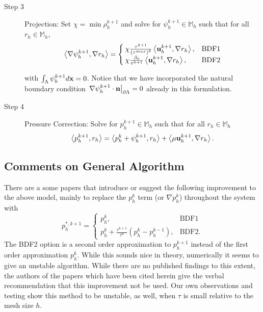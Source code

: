 \documentclass[letterpaper]{erdc}
\begin{document}
\begin{description}
\item[Step 3] Projection: Set $\chi = \min \rho_h^{k+1}$ and solve for $\psi_h^{k+1}\in \mathbb{M}_h$ such that for all $r_h\in \mathbb{M}_h$,
\begin{equation}
 \left\langle \nabla \psi_h^{k+1}, \nabla r_h \right\rangle = \begin{cases} \chi\frac{\tau^{k+1}}{\left(\tau^{max}\right)^2} \left\langle \textbf{u}_h^{k+1}, \nabla r_h \right\rangle, & \mbox{BDF1}\\ \chi\frac{\beta_0}{\tau^{k+1}} \left\langle \textbf{u}_h^{k+1}, \nabla r_h \right\rangle, & \mbox{BDF2} \end{cases}
\end{equation}

with $\int_{\Lambda}\psi_h^{k+1}d\textbf{x} = 0$.  Notice that we have incorporated the
natural boundary condition
$\left.\nabla\psi_h^{k+1}\cdot\textbf{n}\right|_{\partial\Lambda} = 0 $ already in this
formulation.

\item[Step 4] Pressure Correction: Solve for $p_h^{k+1}\in \mathbb{M}_h$ such that for all $r_h\in \mathbb{M}_h$
\begin{equation}
  \left\langle p_h^{k+1}, r_h \right\rangle = \left\langle p_h^{k} + \psi_h^{k+1}, r_h \right\rangle + \left\langle \mu \textbf{u}_h^{k+1}, \nabla r_h \right\rangle.
\end{equation}
\end{description}

%
%
\subsection{Comments on General Algorithm}
\begin{remark}
  There are a some papers that introduce or suggest the following improvement
  to the above model, mainly to replace the $p^{k}_h$ term (or
  $\nabla p^{k}_h$) throughout the system with
\begin{equation}
  p_h^{*,k+1} = \begin{cases}
                p_h^{k}, & \mbox{BDF1}\\
                p_h^{k} + \frac{\tau^{k+1}}{\tau^{k}}\left( p_h^k - p_h^{k-1} \right), & \mbox{BDF2}.
                \end{cases}
\end{equation}
The BDF2 option is a second order approximation to $p^{k+1}_h$ instead of the
first order approximation $p_h^k$.  While this sounds nice in theory,
numerically it seems to give an unstable algorithm.  While there are no
published findings to this extent, the authors of the papers which have been
cited herein give the verbal recommendation that this improvement not be used.
Our own observations and testing show this method to be unstable, as well, when
$\tau$ is small relative to the mesh size $h$.
\end{remark}
\end{document}
